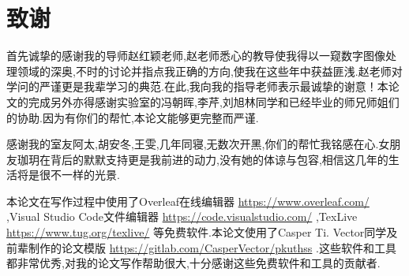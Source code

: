 \chapter{致谢}
首先诚挚的感谢我的导师赵红颖老师,赵老师悉心的教导使我得以一窥数字图像处理领域的深奥,不时的讨论并指点我正确的方向,使我在这些年中获益匪浅.赵老师对学问的严谨更是我辈学习的典范.在此,我向我的指导老师表示最诚挚的谢意！本论文的完成另外亦得感谢实验室的冯朝晖,李芹,刘旭林同学和已经毕业的师兄师姐们的协助.因为有你们的帮忙,本论文能够更完整而严谨.
\par
感谢我的室友阿太,胡安冬,王雯,几年同寝,无数次开黑,你们的帮忙我铭感在心.女朋友珈玥在背后的默默支持更是我前进的动力,没有她的体谅与包容,相信这几年的生活将是很不一样的光景.
\par
本论文在写作过程中使用了Overleaf在线编辑器 \url{https://www.overleaf.com/} ,Visual Studio Code文件编辑器 \url{https://code.visualstudio.com/} ,TexLive \url{https://www.tug.org/texlive/} 等免费软件.本论文使用了Casper Ti. Vector同学及前辈制作的论文模版 \url{https://gitlab.com/CasperVector/pkuthss} .这些软件和工具都非常优秀,对我的论文写作帮助很大,十分感谢这些免费软件和工具的贡献者.

